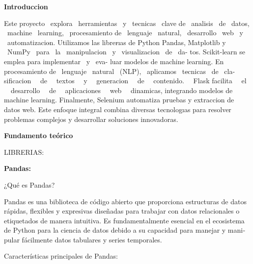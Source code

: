 \documentclass[letterpaper]{article}
\begin{document}
\bigskip


\bigskip


\bigskip


\bigskip


\bigskip


\bigskip


\bigskip


\bigskip

{
\textbf{Introduccio$\acute{}$n}}

{
Este proyecto \ explora \ herramientas \ y \ te$\acute{}$cnicas \ clave de \ ana$\acute{}$lisis \ de \ datos, \ machine
\ learning, \ procesamiento de \ lenguaje \ natural, \ desarrollo \ web \ y \ automatizacio$\acute{}$n. Utilizamos las
librer$\acute{}$ıas de Python Pandas, Matplotlib y \ NumPy \ para \ la \ manipulacio$\acute{}$n \ y
\ visualizacio$\acute{}$n \ de \ da- tos. Scikit-learn se emplea para implementar \ y \ eva- luar modelos de machine
learning. En procesamiento de \ lenguaje \ natural \ (NLP), \ aplicamos \ te$\acute{}$cnicas \ de \ cla-
sificacio$\acute{}$n \ \ de \ \ textos \ \ y \ \ generacio$\acute{}$n \ \ de \ \ contenido. \ \ Flask facilita \ \ el
\ \ desarrollo \ \ de \ \ aplicaciones \ \ web \ \ dina$\acute{}$micas, integrando modelos de machine learning.
Finalmente, Selenium automatiza pruebas y extraccio$\acute{}$n de datos web. Este enfoque integral combina diversas
tecnolog$\acute{}$ıas para resolver problemas complejos y desarrollar soluciones innovadoras.}

\clearpage
\pagestyle{Convertediii}
{
\foreignlanguage{spanish}{\textbf{Fundamento teórico}}}

{
\foreignlanguage{spanish}{LIBRERIAS:}}

{
\foreignlanguage{spanish}{\textbf{Pandas:}}}

{
\foreignlanguage{spanish}{¿Qué es Pandas?}}

{
\foreignlanguage{spanish}{Pandas es una biblioteca de código abierto que proporciona estructuras de datos rápidas,
flexibles y expresivas diseñadas para trabajar con datos relacionales o etiquetados de manera intuitiva. Es
fundamentalmente esencial en el ecosistema de Python para la ciencia de datos debido a su capacidad para manejar y
manipular fácilmente datos tabulares y series temporales.}}

{
\foreignlanguage{spanish}{Características principales de Pandas:}}
\end{document}
